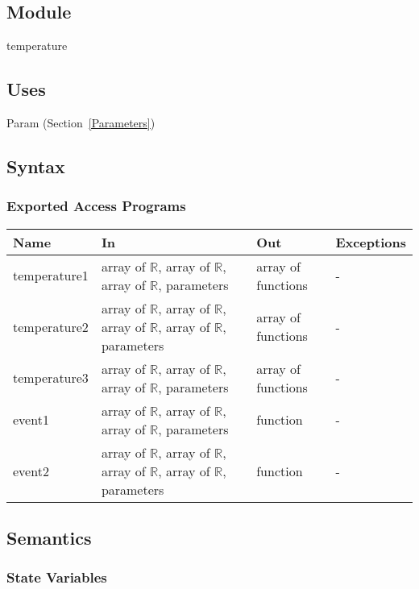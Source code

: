 \documentclass[12pt]{article}
\begin{document}
\subsection{Module}

temperature

\subsection{Uses}

Param (Section~\ref{Parameters})

\subsection{Syntax}

\subsubsection{Exported Access Programs}

\begin{center}
\begin{tabular}{p{3cm} p{5cm} p{4cm} p{2cm}}
\hline
\textbf{Name} & \textbf{In} & \textbf{Out} & \textbf{Exceptions} \\
\hline
temperature1 & array of $\mathbb{R}$, array of $\mathbb{R}$, array of $\mathbb{R}$, parameters & array of functions & - \\
\hline
temperature2 & array of $\mathbb{R}$, array of $\mathbb{R}$, array of $\mathbb{R}$, array of $\mathbb{R}$, parameters & array of functions & - \\
\hline
temperature3 & array of $\mathbb{R}$, array of $\mathbb{R}$, array of $\mathbb{R}$, parameters & array of functions & - \\
\hline
event1 & array of $\mathbb{R}$, array of $\mathbb{R}$, array of $\mathbb{R}$, parameters & function & - \\
\hline
event2 & array of $\mathbb{R}$, array of $\mathbb{R}$, array of $\mathbb{R}$, array of $\mathbb{R}$, parameters & function & - \\
\hline
\end{tabular}
\end{center}

\subsection{Semantics}

\subsubsection{State Variables}
\end{document}
